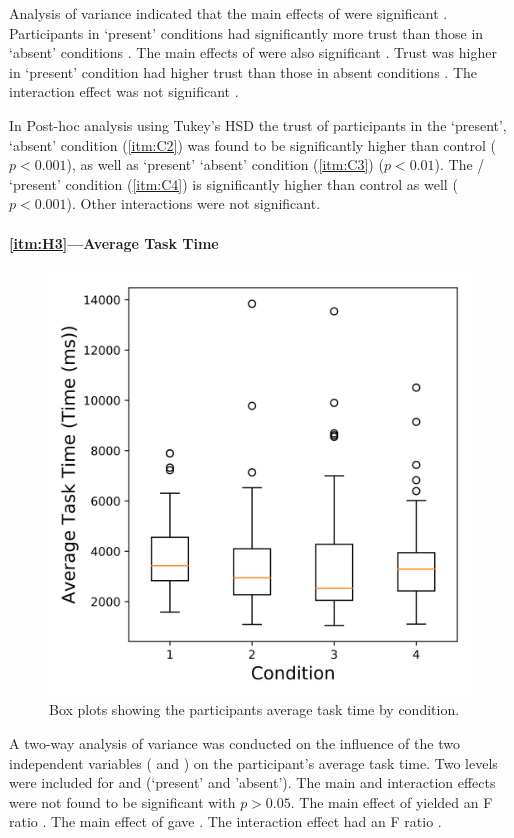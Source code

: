 Analysis of variance indicated that the main effects of \xQ{} were significant . Participants in \xQ{} `present' conditions  had significantly more trust than those in \xQ{} `absent' conditions . The main effects of \xO{} were also significant . Trust was higher in \xO{} `present' condition  had higher trust than those in \xO{} absent conditions . The interaction effect was not significant .

In Post-hoc analysis using Tukey's HSD the trust of participants in the \xQ{} `present', \xO{} `absent' condition (\ref{itm:C2}) was found to be significantly higher than control ($p<0.001$), as well as \xO{} `present' \xQ{} `absent' condition (\ref{itm:C3}) ($p<0.01$). The \xQ/\xO{} `present' condition (\ref{itm:C4}) is significantly higher than control as well ($p<0.001$). Other interactions were not significant.

\paragraph{\ref{itm:H3}---Average Task Time}
       \begin{figure}[tb]
            \centering
            \includegraphics[width=0.8\linewidth]{Figures/avg_time_box.png}
            \caption{Box plots showing the participants average task time by condition.}
            \label{fig:time_box}
       \end{figure}
A two-way analysis of variance was conducted on the influence of the two independent variables (\xQ{} and \xO) on the participant's average task time. Two levels were included for \xQ{} and \xO{} (`present' and 'absent'). The main and interaction effects were not found to be significant with $p>0.05$. The main effect of \xQ{} yielded an F ratio . The main effect of \xO{} gave . The interaction effect had an F ratio .

